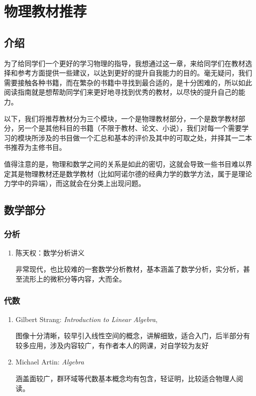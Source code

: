 \chapter{物理教材推荐}

\section*{介绍}

为了给同学们一个更好的学习物理的指导，我想通过这一章，来给同学们在教材选择和参考方面提供一些建议，以达到更好的提升自我能力的目的。毫无疑问，我们需要接触各种书籍，而在繁杂的书籍中寻找到最合适的，是十分困难的，所以如此阅读指南就是想帮助同学们来更好地寻找到优秀的教材，以尽快的提升自己的能力。

以下，我们将推荐教材分为三个模块，一个是物理教材部分，一个是数学教材部分，另一个是其他科目的书籍（不限于教材、论文、小说），我们对每一个需要学习的模块所涉及的书目做一个汇总和基本的评价及其中的可取之处，并择其一二本书推荐为主修书目。

值得注意的是，物理和数学之间的关系是如此的密切，这就会导致一些书目难以界定其是物理教材还是数学教材（比如阿诺尔德的经典力学的数学方法，属于是理论力学中的异端），而这就会在分类上出现问题。

\section{数学部分}

\subsection*{分析}

\begin{enumerate}
  \item 陈天权：数学分析讲义

  非常现代，也比较难的一套数学分析教材，基本涵盖了数学分析，实分析，甚至流形上的微积分等内容，大而全。
\end{enumerate}

\subsection*{代数}

\begin{enumerate}
  \item Gilbert Strang: \textit{Introduction to Linear Algebra},

  图像十分清晰，较早引入线性空间的概念，讲解细致，适合入门，后半部分有较多应用，涉及内容较广，有作者本人的网课，对自学较为友好
  \item Michael Artin: \textit{Algebra}
  
  涵盖面较广，群环域等代数基本概念均有包含，轻证明，比较适合物理人阅读。
  
\end{enumerate}


